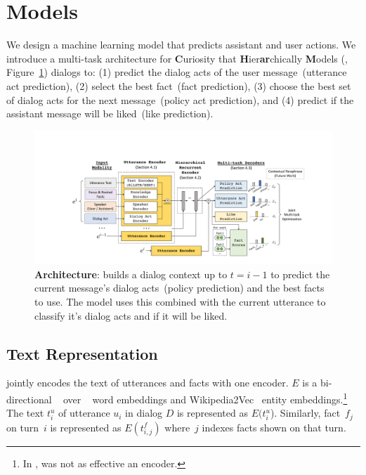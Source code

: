\section{Models}
\label{sec:method}

We design a machine learning model that predicts assistant and user actions.
We introduce a multi-task architecture for \textbf{C}uriosity that \textbf{H}ier\textbf{ar}chically \textbf{M}odels (\charm{}, Figure~\ref{fig:model}) dialogs to:
(1) predict the dialog acts of the user message~(utterance act prediction),
(2) select the best fact~(fact prediction),
(3) choose the best set of dialog acts for the next message~(policy act prediction),
and (4) predict if the assistant message will be liked~(like prediction).

\begin{figure}[t]
    \centering
    \includegraphics[width=\linewidth]{2020_emnlp_curiosity/figures/charm-model}
    \caption{
        \textbf{Architecture}:  builds a dialog context up to $t=i-1$ to predict the current message's dialog acts~(policy prediction) and the best facts to use.
        The model uses this combined with the current utterance to classify it's dialog acts and if it will be liked.
    }
    \label{fig:model}
\end{figure}

\subsection{Text Representation}
\label{subsec:method:text}
\charm{} jointly encodes the text of utterances and facts with one encoder.
$E$ is a bi-directional ~\citep{Sutskever2014SequenceTS} over \glove{}~\citep{pennington2014glove} word embeddings and Wikipedia2Vec~\citep{yamada2018wikipedia2vec} entity embeddings.\footnote{
    In \charm{}, \bert{} was not as effective an encoder.
}
The text $t_i^u$ of utterance $u_i$ in dialog $D$ is represented as $E(t_i^u$).
Similarly, fact~$f_j$ on turn~$i$ is represented as $E(t_{i,j}^f)$ where~$j$ indexes facts shown on that turn.

